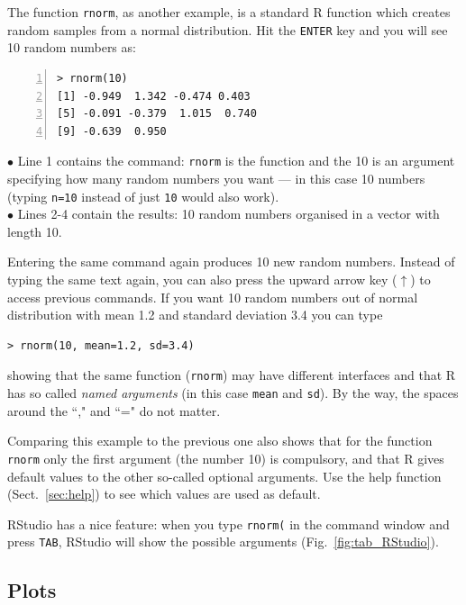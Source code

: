 \documentclass[a4paper,11pt,twocolumn,tablecaptionabove]{scrartcl} %
\makeatletter
\let\SF@@footnote\footnote
\def\footnote{\ifx\protect\@typeset@protect
 \expandafter\SF@@footnote
 \else
 \expandafter\SF@gobble@opt
 \fi
}
\edef\SF@gobble@opt{\noexpand\protect
 \expandafter\noexpand\csname SF@gobble@opt \endcsname}
\makeatother
\begin{document}
The function \texttt{rnorm}, as another example, is a standard R function which creates random samples from a normal distribution.  Hit the \texttt{ENTER} key and you will see 10 random numbers as:

\begin{Verbatim}[frame=single,numbers=left,gobble=0, xleftmargin=0.35cm, numbersep=0.1cm]
> rnorm(10)
[1] -0.949  1.342 -0.474 0.403 
[5] -0.091 -0.379  1.015  0.740 
[9] -0.639  0.950
\end{Verbatim}

\noindent $\bullet$ Line 1 contains the command: \texttt{rnorm} is the function and the 10 is an argument specifying how many random numbers you want --- in this case 10 numbers (typing \texttt{n=10} instead of just \texttt{10} would also work).\\
\noindent $\bullet$  Lines 2-4 contain the results: 10 random numbers organised in a vector with length 10.

Entering the same command again produces 10 new random numbers. Instead of typing the same text again, you can also press the upward arrow key ($\uparrow$) to access previous commands.  If you want 10 random numbers out of normal distribution with mean 1.2 and standard deviation 3.4 you can type 
\begin{Verbatim}[frame=single,gobble=0]
> rnorm(10, mean=1.2, sd=3.4)
\end{Verbatim}
showing that the same function (\texttt{rnorm}) may have different interfaces and that R has so called \emph{named arguments}  (in this case \texttt{mean} and \texttt{sd}). By the way, the spaces around the ``," and ``=" do not matter.

Comparing this example to the previous one also shows that for the function \texttt{rnorm} only the first argument (the number 10) is compulsory, and that R gives default values to the other so-called optional arguments.\footnote{Use the help function (Sect.~\ref{sec:help}) to see which values are used as default.} 

RStudio has a nice feature: when you type \verb!rnorm(! in the command window and press \texttt{TAB}, RStudio will show the possible arguments (Fig.~\ref{fig:tab_RStudio}).

\subsection{Plots}
\end{document}
